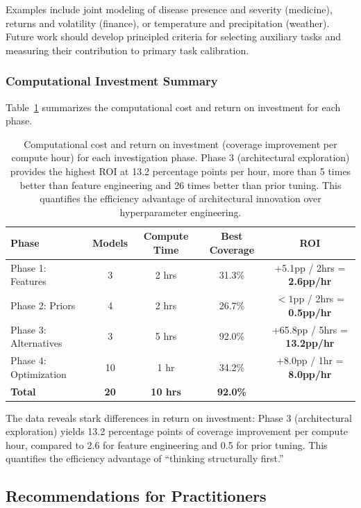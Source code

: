 Examples include joint modeling of disease presence and severity (medicine), returns and volatility (finance), or temperature and precipitation (weather). Future work should develop principled criteria for selecting auxiliary tasks and measuring their contribution to primary task calibration.

\subsubsection{Computational Investment Summary}

Table~\ref{tab:computational_cost_summary} summarizes the computational cost and return on investment for each phase.

\begin{table}[t]
\centering
\begin{tabular}{@{}lcccc@{}}
\toprule
\textbf{Phase} & \textbf{Models} & \textbf{Compute Time} & \textbf{Best Coverage} & \textbf{ROI} \\
\midrule
Phase 1: Features & 3 & 2 hrs & 31.3\% & +5.1pp / 2hrs = \textbf{2.6pp/hr} \\
Phase 2: Priors & 4 & 2 hrs & 26.7\% & $<1$pp / 2hrs = \textbf{0.5pp/hr} \\
Phase 3: Alternatives & 3 & 5 hrs & 92.0\% & +65.8pp / 5hrs = \textbf{13.2pp/hr} \\
Phase 4: Optimization & 10 & 1 hr & 34.2\% & +8.0pp / 1hr = \textbf{8.0pp/hr} \\
\midrule
\textbf{Total} & \textbf{20} & \textbf{10 hrs} & \textbf{92.0\%} & \\
\bottomrule
\end{tabular}
\caption{Computational cost and return on investment (coverage improvement per compute hour) for each investigation phase. Phase 3 (architectural exploration) provides the highest ROI at 13.2 percentage points per hour, more than 5 times better than feature engineering and 26 times better than prior tuning. This quantifies the efficiency advantage of architectural innovation over hyperparameter engineering.}
\label{tab:computational_cost_summary}
\end{table}

The data reveals stark differences in return on investment: Phase 3 (architectural exploration) yields 13.2 percentage points of coverage improvement per compute hour, compared to 2.6 for feature engineering and 0.5 for prior tuning. This quantifies the efficiency advantage of ``thinking structurally first.''

\subsection{Recommendations for Practitioners}
\label{subsec:recommendations}

